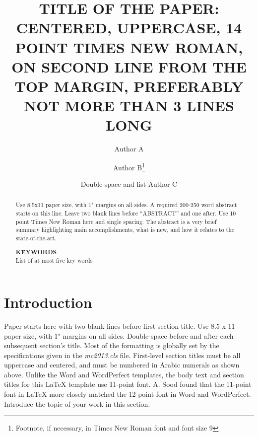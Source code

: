 \documentclass{ansconf}
\begin{document}
\title{TITLE OF THE PAPER: CENTERED, UPPERCASE, 14 POINT TIMES NEW ROMAN, ON
  SECOND LINE FROM THE TOP MARGIN, PREFERABLY NOT MORE THAN 3 LINES LONG}

\author{Author A}
\author{Author B\footnote{Footnote, if necessary, in Times 
  New Roman font and font size 9}}

\author{Double space and list Author C}

\maketitle

\begin{abstract}
Use 8.5x11 paper size, with 1" margins on all sides.  A required 200-250 word
abstract starts on this line.  Leave two blank lines before ``ABSTRACT'' and one
after.  Use 10 point Times New Roman here and single spacing. The abstract is a
very brief summary highlighting main accomplishments, what is new, and how it
relates to the state-of-the-art.

\raggedleft
\textbf{KEYWORDS}\\ 
List of at most five key words
\end{abstract}

\section{Introduction}

Paper starts here with two blank lines before first section title.  Use 
8.5 x 11 paper size, with 1" margins on all sides.  Double-space before and
after each subsequent section's title.  Most of the formatting is globally
set by the specifications given in the {\it mc2013.cls} file.  
First-level section titles must be all uppercase and centered, and must 
be numbered in Arabic numerals as shown above.  Unlike the Word and WordPerfect
templates, the body text and section titles for this {\LaTeX} template use 
11-point font.  A. Sood found that the 11-point font in {\LaTeX} more closely 
matched the 12-point font in Word and WordPerfect.  Introduce the topic of 
your work in this section.
\end{document}
